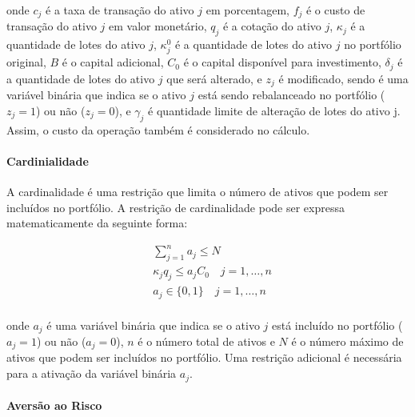                     \noindent onde $c_{j}$ é a taxa de transação do ativo $j$ em porcentagem, $f_{j}$ é o custo de transação do ativo $j$ em valor monetário, $q_{j}$ é a cotação do ativo $j$, $\kappa_{j}$ é a quantidade de lotes do ativo $j$, $\kappa_{j}^{0}$ é a quantidade de lotes do ativo $j$ no portfólio original, $B$ é o capital adicional, $C_{0}$ é o capital disponível para investimento, $\delta_{j}$ é a quantidade de lotes do ativo $j$ que será alterado, e $z_{j}$ é modificado, sendo é uma variável binária que indica se o ativo $j$ está sendo rebalanceado no portfólio ($z_{j}=1$) ou não ($z_{j}=0$), e $\gamma_{j}$ é quantidade limite de alteração de lotes do ativo j. Assim, o custo da operação também é considerado no cálculo.


                \paragraph{Cardinialidade}

                    \ipar A cardinalidade é uma restrição que limita o número de ativos que podem ser incluídos no portfólio. A restrição de cardinalidade pode ser expressa matematicamente da seguinte forma:

                    \begin{equation}
                        \begin{aligned}
                            & \sum_{j=1}^{n} a_{j} \leq N \\
                            &\kappa_{j} q_{j} \leq a_{j} C_{0} \quad j=1, \ldots, n \\
                            & a_{j} \in\{0,1\} \quad j=1, \ldots, n \\
                        \end{aligned}
                    \end{equation}

                    \noindent onde $a_{j}$ é uma variável binária que indica se o ativo $j$ está incluído no portfólio ($a_{j}=1$) ou não ($a_{j}=0$), $n$ é o número total de ativos e $N$ é o número máximo de ativos que podem ser incluídos no portfólio. Uma restrição adicional é necessária para a ativação da variável binária $a_{j}$.
                    
                \paragraph{Aversão ao Risco}

